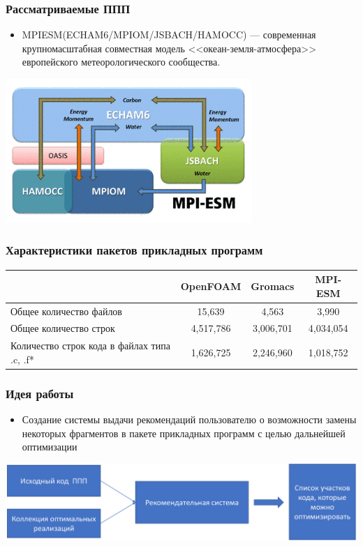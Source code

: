\documentclass{beamer}
\begin{document}
\begin{frame}
\frametitle{Рассматриваемые ППП}
\begin{itemize}
	\item MPIESM(ECHAM6/MPIOM/JSBACH/HAMOCC) --- современная крупномасштабная
    совместная модель <<океан-земля-атмосфера>> европейского метеорологического сообщества.
\end{itemize}
\begin{center}
\includegraphics[width=0.7\textwidth]{img/mpiesm.png}
\end{center}
\end{frame}

\begin{frame}
\frametitle{Характеристики пакетов прикладных программ}
\renewcommand{\arraystretch}{1.8} %
\begin{tabular}{|p{3.8cm}|c|c|c|}
\hline
 & OpenFOAM &  Gromacs & MPI-ESM\\
\hline
Общее количество
\newline файлов & 15,639 & 4,563 & 3,990\\
\hline
Общее количество строк & 4,517,786 & 3,006,701 & 4,034,054 \\
\hline
Количество строк  кода
\newline в файлах типа .c, .f* & 1,626,725 & 2,246,960 & 1,018,752\\
\hline
\end{tabular}
\end{frame}


\begin{frame}
\frametitle{Идея работы}
\begin{itemize}
	\item Создание системы выдачи рекомендаций пользователю о возможности замены
	 некоторых фрагментов в пакете прикладных программ с целью дальнейшей оптимизации
\end{itemize}
\vspace{1cm}
\includegraphics[width=\textwidth]{img/idea.eps}
\end{frame}
\end{document}
